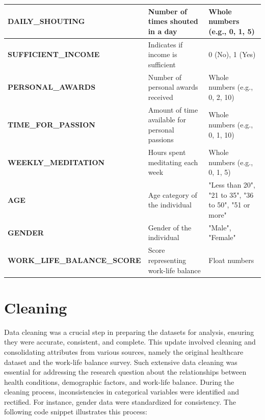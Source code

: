 \documentclass[runningheads]{llncs}
\begin{document}
\begin{enumerate}
\begin{table}[ht]
\begin{tabular}{|l|p{5cm}|p{4cm}|}
\hline
\textbf{DAILY\_SHOUTING} & Number of times shouted in a day & Whole numbers (e.g., 0, 1, 5) \\ 
\hline
\textbf{SUFFICIENT\_INCOME} & Indicates if income is sufficient & 0 (No), 1 (Yes) \\ 
\hline
\textbf{PERSONAL\_AWARDS} & Number of personal awards received & Whole numbers (e.g., 0, 2, 10) \\ 
\hline
\textbf{TIME\_FOR\_PASSION} & Amount of time available for personal passions & Whole numbers (e.g., 0, 1, 10) \\ 
\hline
\textbf{WEEKLY\_MEDITATION} & Hours spent meditating each week & Whole numbers (e.g., 0, 1, 5) \\ 
\hline
\textbf{AGE} & Age category of the individual & "Less than 20", "21 to 35", "36 to 50", "51 or more" \\ 
\hline
\textbf{GENDER} & Gender of the individual & "Male", "Female" \\ 
\hline
\textbf{WORK\_LIFE\_BALANCE\_SCORE} & Score representing work-life balance & Float numbers \\ 
\hline
\end{tabular}
\end{table}

\clearpage
\section{Cleaning}

Data cleaning was a crucial step in preparing the datasets for analysis, ensuring they were accurate, consistent, and complete. This update involved cleaning and consolidating attributes from various sources, namely the original healthcare dataset and the work-life balance survey. Such extensive data cleaning was essential for addressing the research question about the relationships between health conditions, demographic factors, and work-life balance. During the cleaning process, inconsistencies in categorical variables were identified and rectified. For instance, gender data were standardized for consistency. The following code snippet illustrates this process:


\end{enumerate}
\end{document}
